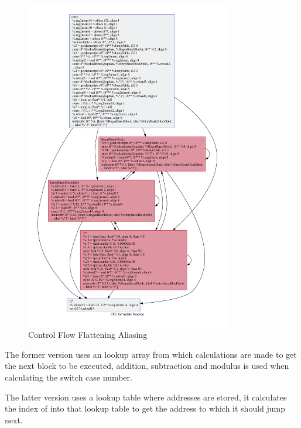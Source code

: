\begin{figure}[t]
  \includegraphics[width=0.8\textwidth]{./images/update_alias.pdf}
  \caption{Control Flow Flattening Aliasing}
\end{figure}

The former version uses an lookup array from which calculations are made to get the next block to be executed, addition,
subtraction and modulus is used when calculating the switch case number.

The latter version uses a lookup table where addresses are stored, it calculates the index of into that lookup table to get the address to which it should jump
next.